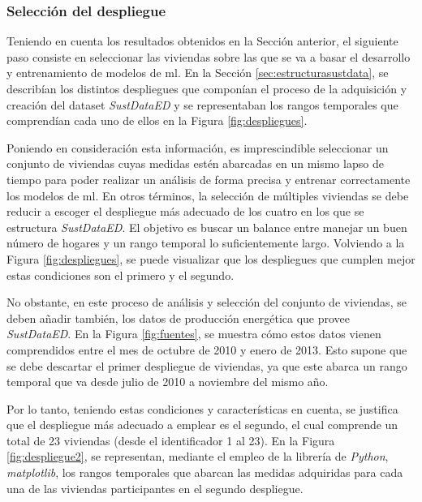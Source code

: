 \pagebreak

\subsubsection{Selección del despliegue}

Teniendo en cuenta los resultados obtenidos en la Sección anterior, el siguiente paso consiste en seleccionar las viviendas sobre las que se va a basar el desarrollo y entrenamiento de modelos de \gls{ml}. En la Sección \ref{sec:estructurasustdata}, se describían los distintos despliegues que componían el proceso de la adquisición y creación del dataset \textit{SustDataED} y se representaban los rangos temporales que comprendían cada uno de ellos en la Figura \ref{fig:despliegues}. 

\vspace{3mm}

Poniendo en consideración esta información, es imprescindible seleccionar un conjunto de viviendas cuyas medidas estén abarcadas en un mismo lapso de tiempo para poder realizar un análisis de forma precisa y entrenar correctamente los modelos de \gls{ml}. En otros términos, la selección de múltiples viviendas se debe reducir a escoger el despliegue más adecuado de los cuatro en los que se estructura \textit{SustDataED}. El objetivo es buscar un balance entre manejar un buen número de hogares y un rango temporal lo suficientemente largo. Volviendo a la Figura \ref{fig:despliegues}, se puede visualizar que los despliegues que cumplen mejor estas condiciones son el primero y el segundo. 

\vspace{3mm}

No obstante, en este proceso de análisis y selección del conjunto de viviendas, se deben añadir también, los datos de producción energética que provee \textit{SustDataED}. En la Figura \ref{fig:fuentes}, se muestra cómo estos datos vienen comprendidos entre el mes de octubre de 2010 y enero de 2013. Esto supone que se debe descartar el primer despliegue de viviendas, ya que este abarca un rango temporal que va desde julio de 2010 a noviembre del mismo año.

\vspace{3mm}

Por lo tanto, teniendo estas condiciones y características en cuenta, se justifica que el despliegue más adecuado a emplear es el segundo, el cual comprende un total de 23 viviendas (desde el identificador 1 al 23). En la Figura \ref{fig:despliegue2}, se representan, mediante el empleo de la librería de \textit{Python}, \textit{matplotlib}, los rangos temporales que abarcan las medidas adquiridas para cada una de las viviendas participantes en el segundo despliegue.

